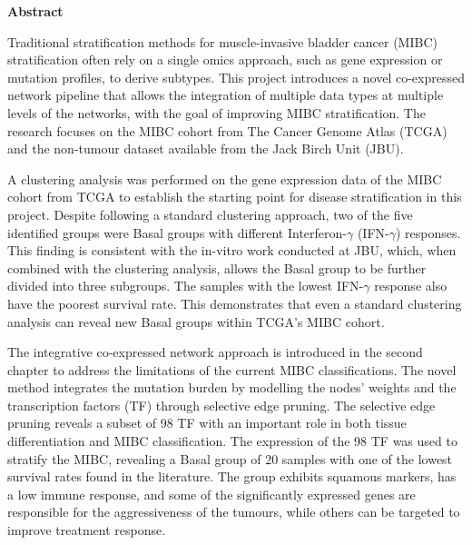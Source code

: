 \thispagestyle{plain}
\begin{center}
    \Large        
    \textbf{Abstract}
    \vspace{0.2cm}
\end{center}


Traditional stratification methods for muscle-invasive bladder cancer (MIBC) stratification often rely on a single omics approach, such as gene expression or mutation profiles, to derive subtypes. This project introduces a novel co-expressed network pipeline that allows the integration of multiple data types at multiple levels of the networks, with the goal of improving MIBC stratification. The research focuses on the MIBC cohort from The Cancer Genome Atlas (TCGA) and the non-tumour dataset available from the Jack Birch Unit (JBU).

A clustering analysis was performed on the gene expression data of the MIBC cohort from TCGA to establish the starting point for disease stratification in this project. Despite following a standard clustering approach, two of the five identified groups were Basal groups with different Interferon-$\gamma$ (IFN-$\gamma$) responses. This finding is consistent with the in-vitro work conducted at JBU, which, when combined with the clustering analysis, allows the Basal group to be further divided into three subgroups. The samples with the lowest IFN-$\gamma$ response also have the poorest survival rate. This demonstrates that even a standard clustering analysis can reveal new Basal groups within TCGA's MIBC cohort.


% 
The integrative co-expressed network approach is introduced in the second chapter to address the limitations of the current MIBC classifications. The novel method integrates the mutation burden by modelling the nodes' weights and the transcription factors (TF) through selective edge pruning. The selective edge pruning reveals a subset of 98 TF with an important role in both tissue differentiation and MIBC classification. The expression of the 98 TF was used to stratify the MIBC, revealing a Basal group of 20 samples with one of the lowest survival rates found in the literature. The group exhibits squamous markers, has a low immune response, and some of the significantly expressed genes are responsible for the aggressiveness of the tumours, while others can be targeted to improve treatment response.


